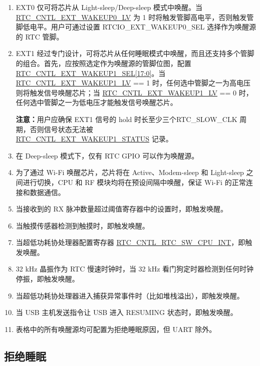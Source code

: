 \documentclass[main\_\_CN.tex]{subfiles}
\begin{document}
\begin{tiplisting}
\vspace{-2em}
\begin{enumerate}
\item EXT0 仅可将芯片从 Light-sleep/Deep-sleep 模式中唤醒。当 \hyperref[fielddesc:RTCCNTLEXTWAKEUP0LV]{RTC\_CNTL\_EXT\_WAKEUP0\_LV} 为 1 时将触发管脚高电平，否则触发管脚低电平。用户可通过设置 RTCIO\_EXT\_WAKEUP0\_SEL 选择作为唤醒源的 RTC 管脚。
\item EXT1 经过专门设计，可将芯片从任何睡眠模式中唤醒，而且还支持多个管脚的组合。首先，应按照选定作为唤醒源的管脚位图，配置 \hyperref[fielddesc:RTCCNTLEXTWAKEUP1SEL]{RTC\_CNTL\_EXT\_WAKEUP1\_SEL[17:0]}。当 \hyperref[fielddesc:RTCCNTLEXTWAKEUP1LV]{RTC\_CNTL\_EXT\_WAKEUP1\_LV} == 1 时，任何选中管脚之一为高电压则将触发信号唤醒芯片；当 \hyperref[fielddesc:RTCCNTLEXTWAKEUP1LV]{RTC\_CNTL\_EXT\_WAKEUP1\_LV} == 0 时，任何选中管脚之一为低电压才能触发信号唤醒芯片。

\textbf{注意：}用户应确保 EXT1 信号的 hold 时长至少三个RTC\_SLOW\_CLK 周期，否则信号状态无法被\\ \hyperref[regdesc:RTCCNTLEXTWAKEUP1STATUSREG]{RTC\_CNTL\_EXT\_WAKEUP1\_STATUS} 记录。
\item 在 Deep-sleep 模式下，仅有 RTC GPIO 可以作为唤醒源。
\item 为了通过 Wi-Fi 唤醒芯片，芯片将在 Active、Modem-sleep 和 Light-sleep 之间进行切换，CPU 和 RF 模块均将在预设间隔中唤醒，保证 Wi-Fi 的正常连接和数据通信。
\item 当接收到的 RX 脉冲数量超过阈值寄存器中的设置时，即触发唤醒。
\item 当触摸传感器检测到触摸时，即触发唤醒。
\item 当超低功耗协处理器配置寄存器  \hyperref[fielddesc:RTCCNTLRTCSWCPUINT]{RTC\_CNTL\_RTC\_SW\_CPU\_INT}，即触发唤醒。
\item 32 kHz 晶振作为 RTC 慢速时钟时，当 32 kHz 看门狗定时器检测到任何时钟停振，即触发唤醒。
\item 当超低功耗协处理器进入捕获异常事件时（比如堆栈溢出），即触发唤醒。
\item 当 USB 主机发送指令让 USB 进入 RESUMING 状态时，即触发唤醒。
\item 表格中的所有唤醒源均可配置为拒绝睡眠原因，但 UART 除外。\\
\end{enumerate}
\end{tiplisting}

\subsection{拒绝睡眠}\label{sec:lpm-reject-source}
\end{document}
